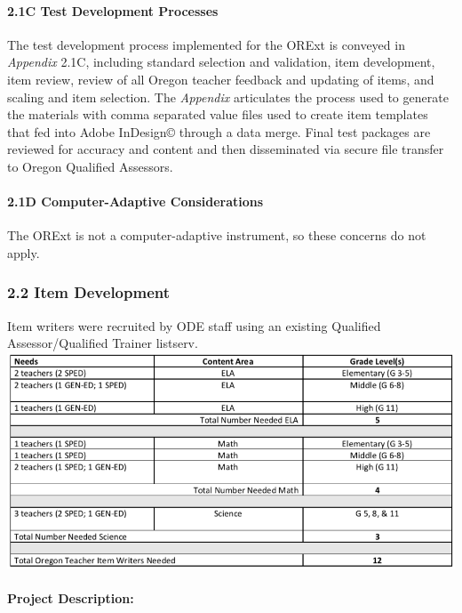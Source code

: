 \documentclass[]{article}
\let\oldparagraph\paragraph
\renewcommand{\paragraph}[1]{\oldparagraph{#1}\mbox{}}
\begin{document}
\paragraph{2.1C Test Development
Processes}\label{c-test-development-processes}

The test development process implemented for the ORExt is conveyed in
\emph{Appendix} 2.1C, including standard selection and validation, item
development, item review, review of all Oregon teacher feedback and
updating of items, and scaling and item selection. The \emph{Appendix}
articulates the process used to generate the materials with comma
separated value files used to create item templates that fed into Adobe
InDesign© through a data merge. Final test packages are reviewed for
accuracy and content and then disseminated via secure file transfer to
Oregon Qualified Assessors.

\paragraph{2.1D Computer-Adaptive
Considerations}\label{d-computer-adaptive-considerations}

The ORExt is not a computer-adaptive instrument, so these concerns do
not apply.

\subsubsection{2.2 Item Development}\label{item-development}

Item writers were recruited by ODE staff using an existing Qualified
Assessor/Qualified Trainer listserv. \FloatBarrier
\includegraphics{Figures/ItemDev/ItemDev.png}

\paragraph{Project Description:}\label{project-description}
\end{document}

